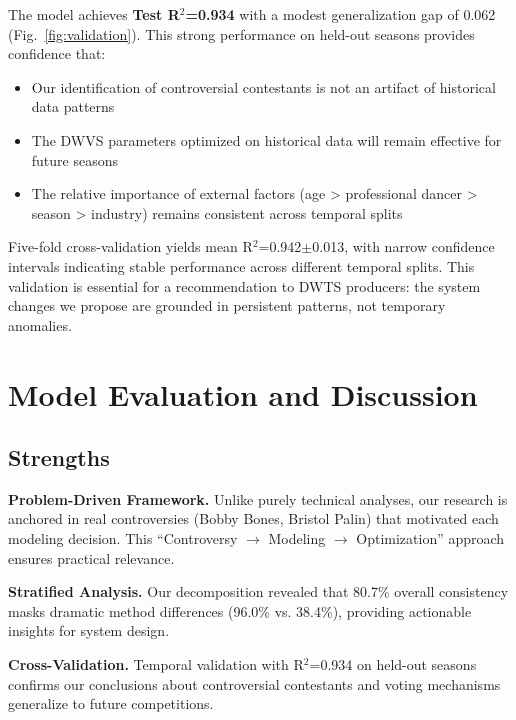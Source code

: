 \documentclass{mcmthesis}
\begin{document}
The model achieves \textbf{Test R$^2$=0.934} with a modest generalization gap of 0.062 (Fig.~\ref{fig:validation}). This strong performance on held-out seasons provides confidence that:

\begin{itemize}
\item Our identification of controversial contestants is not an artifact of historical data patterns
\item The DWVS parameters optimized on historical data will remain effective for future seasons
\item The relative importance of external factors (age > professional dancer > season > industry) remains consistent across temporal splits
\end{itemize}

Five-fold cross-validation yields mean R$^2$=0.942$\pm$0.013, with narrow confidence intervals indicating stable performance across different temporal splits. This validation is essential for a recommendation to DWTS producers: the system changes we propose are grounded in persistent patterns, not temporary anomalies.

\section{Model Evaluation and Discussion}

\subsection{Strengths}

\textbf{Problem-Driven Framework.} Unlike purely technical analyses, our research is anchored in real controversies (Bobby Bones, Bristol Palin) that motivated each modeling decision. This ``Controversy $\rightarrow$ Modeling $\rightarrow$ Optimization'' approach ensures practical relevance.

\textbf{Stratified Analysis.} Our decomposition revealed that 80.7\% overall consistency masks dramatic method differences (96.0\% vs. 38.4\%), providing actionable insights for system design.

\textbf{Cross-Validation.} Temporal validation with R$^2$=0.934 on held-out seasons confirms our conclusions about controversial contestants and voting mechanisms generalize to future competitions.
\end{document}
